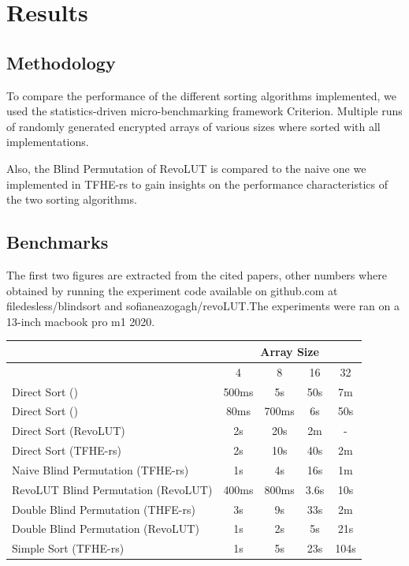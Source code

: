 \documentclass{article}
\begin{document}
\newpage

\section{Results}

\subsection{Methodology}

To compare the performance of the different sorting algorithms implemented, we used the statistics-driven micro-benchmarking framework Criterion. Multiple runs of randomly generated encrypted arrays of various sizes where sorted with all implementations.

Also, the Blind Permutation of RevoLUT is compared to the naive one we implemented in TFHE-rs to gain insights on the performance characteristics of the two sorting algorithms.

\subsection{Benchmarks}

The first two figures are extracted from the cited papers, other numbers where obtained by running the experiment code available on github.com at filedesless/blindsort and sofianeazogagh/revoLUT.\@ The experiments were ran on a 13-inch macbook pro m1 2020.

\begin{center}
    \begin{tabular}{|l||c|c|c|c|}
        \hline
        & \multicolumn{4}{|c|}{Array Size} \\
        \hline
        & 4 & 8 & 16 & 32 \\
        \hline
        Direct Sort (\cite{lauter_depth_2015}) & 500ms & 5s & 50s & 7m \\
        Direct Sort (\cite{iliashenko_faster_2021}) & 80ms & 700ms & 6s & 50s\\
        \hline
        Direct Sort (RevoLUT) & 2s & 20s & 2m & -\\
        Direct Sort (TFHE-rs) & 2s & 10s & 40s & 2m\\
        \hline
        Naive Blind Permutation (TFHE-rs) & 1s & 4s & 16s & 1m\\
        RevoLUT Blind Permutation (RevoLUT) & 400ms & 800ms & 3.6s & 10s\\
        \hline
        Double Blind Permutation (THFE-rs) & 3s & 9s & 33s & 2m\\
        Double Blind Permutation (RevoLUT) & 1s & 2s & 5s & 21s\\
        \hline
        Simple Sort (TFHE-rs) & 1s & 5s & 23s & 104s \\
        \hline
    \end{tabular}
\end{center}
\end{document}
